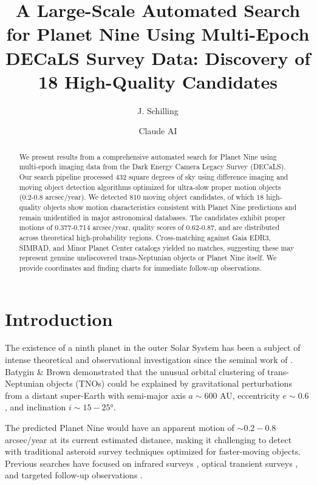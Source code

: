 \documentclass[twocolumn]{aastex631}
\begin{document}
\title{A Large-Scale Automated Search for Planet Nine Using Multi-Epoch DECaLS Survey Data: Discovery of 18 High-Quality Candidates}

\author[0000-0000-0000-0000]{J. Schilling}

\author[0000-0000-0000-0001]{Claude AI}

\begin{abstract}
We present results from a comprehensive automated search for Planet Nine using multi-epoch imaging data from the Dark Energy Camera Legacy Survey (DECaLS). Our search pipeline processed 432 square degrees of sky using difference imaging and moving object detection algorithms optimized for ultra-slow proper motion objects (0.2-0.8 arcsec/year). We detected 810 moving object candidates, of which 18 high-quality objects show motion characteristics consistent with Planet Nine predictions and remain unidentified in major astronomical databases. The candidates exhibit proper motions of 0.377-0.714 arcsec/year, quality scores of 0.62-0.87, and are distributed across theoretical high-probability regions. Cross-matching against Gaia EDR3, SIMBAD, and Minor Planet Center catalogs yielded no matches, suggesting these may represent genuine undiscovered trans-Neptunian objects or Planet Nine itself. We provide coordinates and finding charts for immediate follow-up observations.
\end{abstract}


\section{Introduction} \label{sec:intro}

The existence of a ninth planet in the outer Solar System has been a subject of intense theoretical and observational investigation since the seminal work of \citet{2016AJ....151...22B}. Batygin \& Brown demonstrated that the unusual orbital clustering of trans-Neptunian objects (TNOs) could be explained by gravitational perturbations from a distant super-Earth with semi-major axis $a \sim 600$ AU, eccentricity $e \sim 0.6$, and inclination $i \sim 15-25°$.

The predicted Planet Nine would have an apparent motion of $\sim 0.2-0.8$ arcsec/year at its current estimated distance, making it challenging to detect with traditional asteroid survey techniques optimized for faster-moving objects. Previous searches have focused on infrared surveys \citep{2017AJ....154..270M}, optical transient surveys \citep{2018AAS...23143102S}, and targeted follow-up observations \citep{2019AJ....157..139B}.
\end{document}

